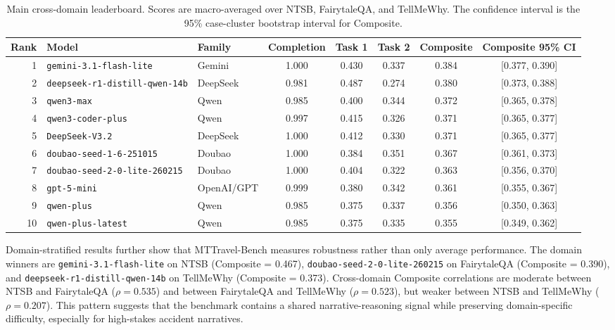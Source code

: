 \documentclass[pdflatex,sn-mathphys-num]{sn-jnl}%
\theoremstyle{thmstyleone}%
\theoremstyle{thmstyletwo}%
\theoremstyle{thmstylethree}%
\begin{document}
\begin{table}[htbp]
\centering
\small
\caption{Main cross-domain leaderboard. Scores are macro-averaged over NTSB, FairytaleQA, and TellMeWhy. The confidence interval is the 95\% case-cluster bootstrap interval for Composite.}
\label{tab:main-leaderboard}
\begin{tabular}{r p{} l c c c c c}
\toprule
Rank & Model & Family & Completion & Task 1 & Task 2 & Composite & Composite 95\% CI \\
\midrule
1 & \texttt{gemini-3.1-flash-lite} & Gemini & 1.000 & 0.430 & 0.337 & 0.384 & [0.377, 0.390] \\
2 & \texttt{deepseek-r1-distill-qwen-14b} & DeepSeek & 0.981 & 0.487 & 0.274 & 0.380 & [0.373, 0.388] \\
3 & \texttt{qwen3-max} & Qwen & 0.985 & 0.400 & 0.344 & 0.372 & [0.365, 0.378] \\
4 & \texttt{qwen3-coder-plus} & Qwen & 0.997 & 0.415 & 0.326 & 0.371 & [0.365, 0.377] \\
5 & \texttt{DeepSeek-V3.2} & DeepSeek & 1.000 & 0.412 & 0.330 & 0.371 & [0.365, 0.377] \\
6 & \texttt{doubao-seed-1-6-251015} & Doubao & 1.000 & 0.384 & 0.351 & 0.367 & [0.361, 0.373] \\
7 & \texttt{doubao-seed-2-0-lite-260215} & Doubao & 1.000 & 0.404 & 0.322 & 0.363 & [0.356, 0.370] \\
8 & \texttt{gpt-5-mini} & OpenAI/GPT & 0.999 & 0.380 & 0.342 & 0.361 & [0.355, 0.367] \\
9 & \texttt{qwen-plus} & Qwen & 0.985 & 0.375 & 0.337 & 0.356 & [0.350, 0.363] \\
10 & \texttt{qwen-plus-latest} & Qwen & 0.985 & 0.375 & 0.335 & 0.355 & [0.349, 0.362] \\
\bottomrule
\end{tabular}
\end{table}

Domain-stratified results further show that MTTravel-Bench measures robustness rather than only average performance. The domain winners are \texttt{gemini-3.1-flash-lite} on NTSB (Composite = 0.467), \texttt{doubao-seed-2-0-lite-260215} on FairytaleQA (Composite = 0.390), and \texttt{deepseek-r1-distill-qwen-14b} on TellMeWhy (Composite = 0.373). Cross-domain Composite correlations are moderate between NTSB and FairytaleQA ($\rho=0.535$) and between FairytaleQA and TellMeWhy ($\rho=0.523$), but weaker between NTSB and TellMeWhy ($\rho=0.207$). This pattern suggests that the benchmark contains a shared narrative-reasoning signal while preserving domain-specific difficulty, especially for high-stakes accident narratives.
\end{document}

